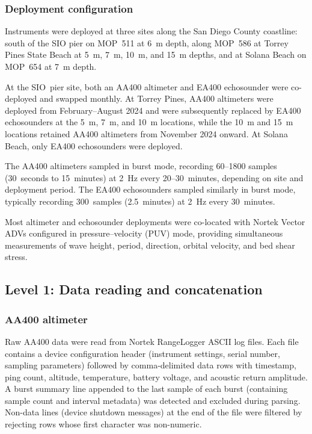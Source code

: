 \subsubsection{Deployment configuration}

Instruments were deployed at three sites along the San Diego County
coastline: south of the SIO pier on MOP~511 at \SI{6}{\meter} depth,
along MOP~586 at Torrey Pines State Beach at \SI{5}{\meter},
\SI{7}{\meter}, \SI{10}{\meter}, and \SI{15}{\meter} depths, and at
Solana Beach on MOP~654 at \SI{7}{\meter} depth.

At the SIO~pier site, both an AA400 altimeter and EA400 echosounder
were co-deployed and swapped monthly. At Torrey Pines, AA400 altimeters
were deployed from February--August 2024 and were subsequently replaced
by EA400 echosounders at the \SI{5}{\meter}, \SI{7}{\meter}, and
\SI{10}{\meter} locations, while the \SI{10}{\meter} and
\SI{15}{\meter} locations retained AA400 altimeters from November 2024
onward. At Solana Beach, only EA400 echosounders were deployed.

The AA400 altimeters sampled in burst mode, recording 60--1800 samples
(30~seconds to 15~minutes) at \SI{2}{\hertz} every 20--30~minutes,
depending on site and deployment period. The EA400 echosounders
sampled similarly in burst mode, typically recording 300~samples
(2.5~minutes) at \SI{2}{\hertz} every 30~minutes.

Most altimeter and echosounder deployments were co-located with Nortek
Vector ADVs configured in pressure--velocity (PUV) mode, providing
simultaneous measurements of wave height, period, direction, orbital
velocity, and bed shear stress.

\subsection{Level 1: Data reading and concatenation}

\subsubsection{AA400 altimeter}

Raw AA400 data were read from Nortek RangeLogger ASCII log files. Each
file contains a device configuration header (instrument settings,
serial number, sampling parameters) followed by comma-delimited data
rows with timestamp, ping count, altitude, temperature, battery
voltage, and acoustic return amplitude. A burst summary line appended
to the last sample of each burst (containing sample count and interval
metadata) was detected and excluded during parsing. Non-data lines
(device shutdown messages) at the end of the file were filtered by
rejecting rows whose first character was non-numeric.

